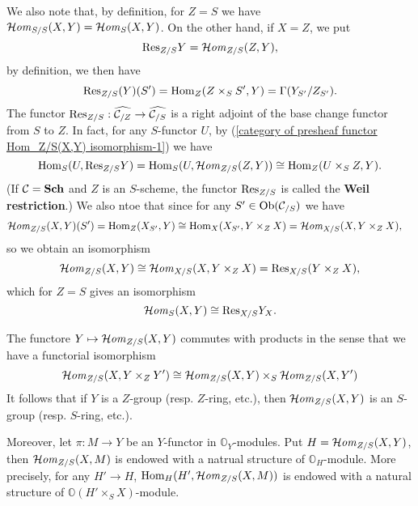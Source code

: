 We also note that, by definition, for $Z=S$ we have $\sHom_{S/S}(X,Y)=\sHom_S(X,Y)$. On the other hand, if $X=Z$, we put
\[\Res_{Z/S}Y=\sHom_{Z/S}(Z,Y),\]
by definition, we then have
\[\Res_{Z/S}(Y)(S')=\Hom_Z(Z\times_SS',Y)=\Gamma(Y_{S'}/Z_{S'}).\]
The functor $\Res_{Z/S}:\widehat{\mathcal{C}_{/Z}}\to\widehat{\mathcal{C}_{/S}}$ is a right adjoint of the base change functor from $S$ to $Z$. In fact, for any $S$-functor $U$, by (\ref{category of presheaf functor Hom_Z/S(X,Y) isomorphism-1}) we have
\[\Hom_S(U,\Res_{Z/S}Y)=\Hom_S(U,\sHom_{Z/S}(Z,Y))\cong\Hom_Z(U\times_SZ,Y).\]
(If $\mathcal{C}=\Sch$ and $Z$ is an $S$-scheme, the functor $\Res_{Z/S}$ is called the \textbf{Weil restriction}.) We also ntoe that since for any $S'\in\Ob(\mathcal{C}_{/S})$ we have 
\begin{align*}
\sHom_{Z/S}(X,Y)(S')&=\Hom_{Z}(X_{S'},Y)\cong\Hom_X(X_{S'},Y\times_ZX)=\sHom_{X/S}(X,Y\times_ZX),
\end{align*}
so we obtain an isomorphism
\[\sHom_{Z/S}(X,Y)\cong\sHom_{X/S}(X,Y\times_ZX)=\Res_{X/S}(Y\times_ZX),\]
which for $Z=S$ gives an isomorphism 
\[\sHom_S(X,Y)\cong \Res_{X/S}Y_X.\]

\begin{remark}\label{category of presheaf functor Hom product commutes}
The functore $Y\mapsto\sHom_{Z/S}(X,Y)$ commutes with products in the sense that we have a functorial isomorphism
\begin{equation}\label{category of presheaf functor Hom product commutes-1}
\sHom_{Z/S}(X,Y\times_ZY')\cong\sHom_{Z/S}(X,Y)\times_S\sHom_{Z/S}(X,Y')
\end{equation}
It follows that if $Y$ is a $Z$-group (resp. $Z$-ring, etc.), then $\sHom_{Z/S}(X,Y)$ is an $S$-group (resp. $S$-ring, etc.).\par
Moreover, let $\pi:M\to Y$ be an $Y$-functor in $\mathbb{O}_Y$-modules. Put $H=\sHom_{Z/S}(X,Y)$, then $\sHom_{Z/S}(X,M)$ is endowed with a natrual structure of $\mathbb{O}_H$-module. More precisely, for any $H'\to H$, $\Hom_H(H',\sHom_{Z/S}(X,M))$ is endowed with a natural structure of $\mathbb{O}(H'\times_SX)$-module.
\end{remark}

